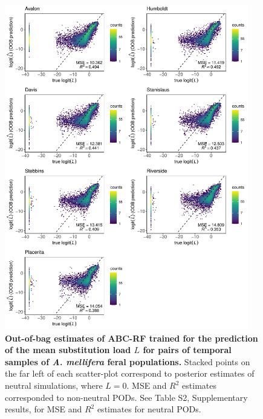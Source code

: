\documentclass[a4paper, 12pt]{article}
\begin{document}
\begin{figure}[ht]
  \centering
  \includegraphics[width=0.95\textwidth]{Figures/FigureS21_combined_plot_load.pdf}
  \small\caption{\textbf{Out-of-bag estimates of ABC-RF trained for the prediction of the mean substitution load $L$ for pairs of temporal samples of \textit{A. mellifera} feral populations.} Stacked points on the far left of each scatter-plot correspond to posterior estimates of neutral simulations, where $L = 0$. MSE and $R^2$ estimates corresponded to non-neutral PODs. See Table S2, Supplementary results, for MSE and $R^2$ estimates for neutral PODs.}
  \label{fig:supple_feralbee_load}
\end{figure}
\end{document}

